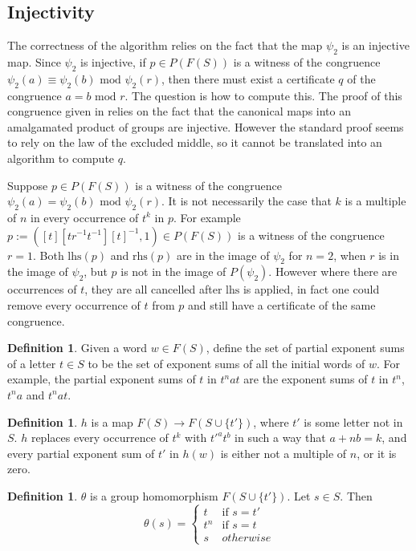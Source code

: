 \documentclass[11pt]{article} %
\theoremstyle{definition}
\theoremstyle{definition}
\theoremstyle{definition}
\theoremstyle{definition}
\theoremstyle{definition}
\newtheorem{defn}[theorem]{Definition}
\theoremstyle{definition}
\begin{document}
\subsection{Injectivity}\label{powproof}

The correctness of the algorithm relies on the fact that the map $\psi_2$ is an injective map.
Since $\psi_2$ is injective, if $p \in P(F(S))$ is a witness of the congruence
$\psi_2(a) \equiv \psi_2(b) \text{ mod } \psi_2(r)$, then there must exist a certificate
$q$ of the congruence $a = b \text{ mod }r$. The question is how to compute this. The proof
of this congruence given in \cite{PutmanOneRelator} relies on the fact that the canonical maps into an amalgamated product
of groups are injective. However the standard proof
seems to rely on the law of the excluded middle, so
it cannot be translated into an algorithm to compute $q$.

Suppose $p \in P(F(S))$ is a witness of the congruence
$\psi_2(a) = \psi_2(b) \text{ mod } \psi_2(r)$. It is not necessarily the case that $k$
is a multiple of $n$ in every occurrence of $t^k$ in $p$. For example
$p := ([t][tr^{-1}t^{-1}][t]^{-1}, 1) \in P(F(S))$ is a witness of the congruence
$r = 1$. Both $\text{lhs}(p)$ and $\text{rhs}(p)$ are in the image of
$\psi_2$ for $n = 2$, when $r$ is in the image of $\psi_2$,
but $p$ is not in the image of $P(\psi_2)$. However where there are
occurrences of $t$, they are all cancelled after $\text{lhs}$ is applied, in fact
one could remove every occurrence of $t$ from $p$ and still have a certificate of the same
congruence.

\begin{defn}
  Given a word $w \in F(S)$, define the set of partial exponent sums of a letter $t \in S$ to
  be the set of exponent sums of all the initial words of $w$. For example, the partial
  exponent sums of $t$ in $t^n a t$ are the exponent sums of $t$ in
  $t^n$, $t^na$ and $t^nat$.
\end{defn}

\begin{defn}
  $h$ is a map $F(S) \to F(S \cup \{t'\})$, where $t'$ is some letter not in $S$.
  $h$ replaces every occurrence of $t^k$ with $t'^at^b$ in such a way that $a + n b = k$,
  and every partial exponent sum of $t'$ in $h(w)$ is either not a multiple of $n$,
  or it is zero.
\end{defn}

\begin{defn}
  $\theta$ is a group homomorphism $F(S \cup \{t'\})$. Let $s \in S$. Then
  \begin{equation}
    \theta(s) = \begin{cases}
      t & \text{if } s = t' \\
      t^n & \text{if } s = t \\
      s & otherwise
    \end{cases}
  \end{equation}
\end{defn}
\end{document}
